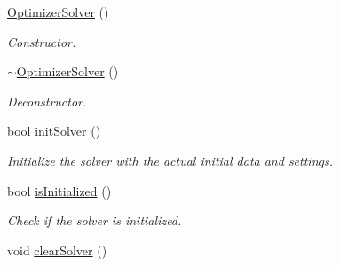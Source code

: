\begin{DoxyCompactItemize}
\item 
\hyperlink{classOSQPWrapper_1_1OptimizerSolver_a6f2aa34afc3a1938212c5093c47e6c22}{Optimizer\+Solver} ()\label{classOSQPWrapper_1_1OptimizerSolver_a6f2aa34afc3a1938212c5093c47e6c22}

\begin{DoxyCompactList}\small\item\em Constructor. \end{DoxyCompactList}\item 
\hyperlink{classOSQPWrapper_1_1OptimizerSolver_ac38954bee1775723f24ecabf66c8fe93}{$\sim$\+Optimizer\+Solver} ()\label{classOSQPWrapper_1_1OptimizerSolver_ac38954bee1775723f24ecabf66c8fe93}

\begin{DoxyCompactList}\small\item\em Deconstructor. \end{DoxyCompactList}\item 
bool \hyperlink{classOSQPWrapper_1_1OptimizerSolver_a33cb56b89b2cd0f8a7cbb211ea63616b}{init\+Solver} ()
\begin{DoxyCompactList}\small\item\em Initialize the solver with the actual initial data and settings. \end{DoxyCompactList}\item 
bool \hyperlink{classOSQPWrapper_1_1OptimizerSolver_a9efa22396dbc284bb6dece9225ccd693}{is\+Initialized} ()
\begin{DoxyCompactList}\small\item\em Check if the solver is initialized. \end{DoxyCompactList}\item 
void \hyperlink{classOSQPWrapper_1_1OptimizerSolver_a6bdb7f0951df8363180b717283c64c99}{clear\+Solver} ()\label{classOSQPWrapper_1_1OptimizerSolver_a6bdb7f0951df8363180b717283c64c99}


\end{DoxyCompactItemize}
